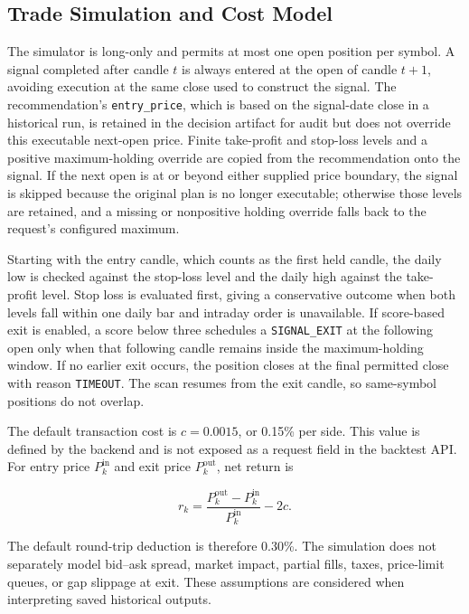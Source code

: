 \subsection{Trade Simulation and Cost Model}
\label{subsec:backtest-trade-simulation}

The simulator is long-only and permits at most one open position per symbol. A signal completed after candle $t$ is always entered at the open of candle $t+1$, avoiding execution at the same close used to construct the signal. The recommendation's \texttt{entry\_price}, which is based on the signal-date close in a historical run, is retained in the decision artifact for audit but does not override this executable next-open price. Finite take-profit and stop-loss levels and a positive maximum-holding override are copied from the recommendation onto the signal. If the next open is at or beyond either supplied price boundary, the signal is skipped because the original plan is no longer executable; otherwise those levels are retained, and a missing or nonpositive holding override falls back to the request's configured maximum.

Starting with the entry candle, which counts as the first held candle, the daily low is checked against the stop-loss level and the daily high against the take-profit level. Stop loss is evaluated first, giving a conservative outcome when both levels fall within one daily bar and intraday order is unavailable. If score-based exit is enabled, a score below three schedules a \texttt{SIGNAL\_EXIT} at the following open only when that following candle remains inside the maximum-holding window. If no earlier exit occurs, the position closes at the final permitted close with reason \texttt{TIMEOUT}. The scan resumes from the exit candle, so same-symbol positions do not overlap.

The default transaction cost is $c=0.0015$, or 0.15\% per side. This value is defined by the backend and is not exposed as a request field in the backtest API. For entry price $P_k^{\mathrm{in}}$ and exit price $P_k^{\mathrm{out}}$, net return is

\begin{equation}
    r_k = \frac{P_k^{\mathrm{out}}-P_k^{\mathrm{in}}}{P_k^{\mathrm{in}}}-2c.
    \label{eq:backtest-net-trade-return}
\end{equation}

The default round-trip deduction is therefore 0.30\%. The simulation does not separately model bid--ask spread, market impact, partial fills, taxes, price-limit queues, or gap slippage at exit. These assumptions are considered when interpreting saved historical outputs.


